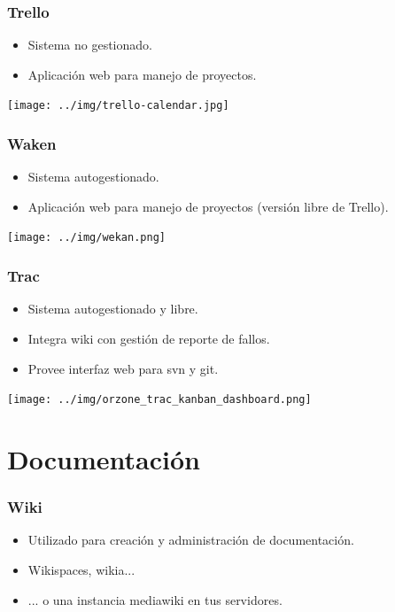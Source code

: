 \documentclass{beamer}
\begin{document}
\begin{frame}
\frametitle{Trello}
		\begin{itemize}
			\pause \item Sistema no gestionado.
			\pause \item Aplicaci\'on web para manejo de proyectos.
		\end{itemize}
		\begin{center}
                 \texttt{[image: ../img/trello-calendar.jpg]}
        \end{center}
		
\end{frame}

\begin{frame}
\frametitle{Waken}
		\begin{itemize}
			\pause \item Sistema autogestionado.
			\pause \item Aplicaci\'on web para manejo de proyectos (versi\'on \alert{libre} de Trello).
 		\end{itemize}
		\begin{center}
                 \texttt{[image: ../img/wekan.png]}
        \end{center}
	
\end{frame}

\begin{frame}
\frametitle{Trac}
		\begin{itemize}
			\pause \item Sistema autogestionado y \alert{libre}.
			\pause \item Integra wiki con gesti\'on de reporte de fallos.
			\pause \item Provee interfaz web para svn y git.
 		\end{itemize}
		\begin{center}
                 \texttt{[image: ../img/orzone\_trac\_kanban\_dashboard.png]}
        \end{center}
	
\end{frame}



\section{Documentaci\'on}

\begin{frame}
\frametitle{Wiki}    
		\begin{itemize}
			\pause \item Utilizado para creaci\'on y administraci\'on de documentaci\'on.
			\pause \item Wikispaces, wikia...
			\pause \item ... o una instancia mediawiki en tus servidores.
 		\end{itemize}

\end{frame}
\end{document}
